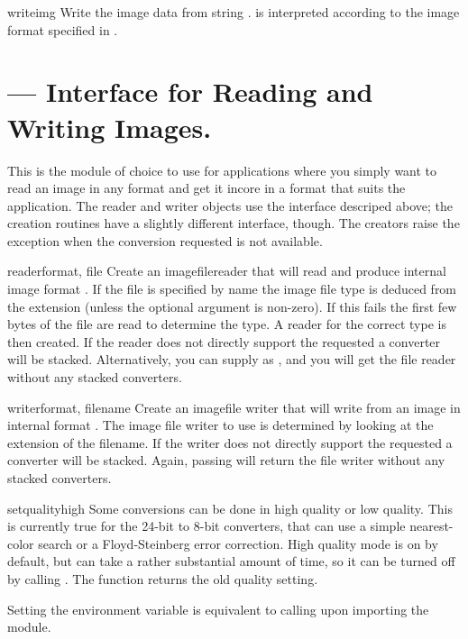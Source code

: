 \begin{methoddesc}[imagefile]{write}{img}
Write the image data from string .  is interpreted
according to the image format specified in .
\end{methoddesc}

\section{ ---
         Interface for Reading and Writing Images.}

This is the module of choice to use for applications where you simply
want to read an image in any format and get it incore in a format that
suits the application. The reader and writer objects use the interface
descriped above; the creation routines have a slightly different
interface, though. The creators raise the 
exception when the conversion requested is not available.

\begin{funcdesc}{reader}{format, file}
Create an imagefilereader that will read  and produce
internal image format . If the file is specified by name
the image file type is deduced from the extension (unless the optional
 argument is non-zero). If this fails the 
first few bytes of the file are read to determine the type. A reader
for the correct type is then created. If the reader does not directly
support the requested
 a converter will be stacked. Alternatively, you can
supply  as , and you will get the file reader
without any stacked converters.
\end{funcdesc}

\begin{funcdesc}{writer}{format, filename}
Create an imagefile writer that will write  from an
image in internal format . The image file writer to use
is determined by looking at the extension of the filename. If the
writer does not directly support the requested  a
converter will be stacked. Again, passing  will return the
file writer without any stacked converters.
\end{funcdesc}

\begin{funcdesc}{setquality}{high}
Some conversions can be done in high quality or low quality. This is
currently true for the 24-bit to 8-bit converters, that can use a
simple nearest-color search or a Floyd-Steinberg error
correction. High quality mode is on by default, but can take a rather
substantial amount of time, so it can be turned off by calling
. The function returns the old quality setting.

Setting the environment variable  is equivalent to
calling  upon importing the module.
\end{funcdesc}

